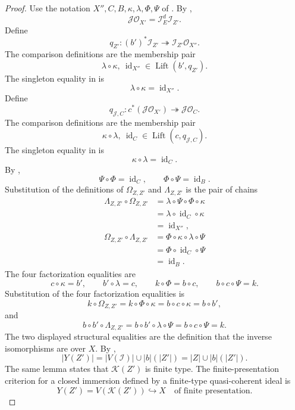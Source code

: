 \begin{proof}
  Use the notation $X'',C,B,\kappa,\lambda,\Phi,\Psi$ of
  .  By
  ,
  \[
    \mathcal J\mathcal O_{X'}
      =\mathcal I_E^d\mathcal I_{Z'}.
  \]
  Define
  \[
    q_{Z'}\colon (b')^*\mathcal I_{Z'}
      \twoheadrightarrow\mathcal I_{Z'}\mathcal O_{X''}.
  \]
  The comparison definitions are the membership pair
  \[
    \lambda\circ\kappa,\ \operatorname{id}_{X''}
      \in\operatorname{Lift}(b',q_{Z'}).
  \]
  The singleton equality in
   is
  \[
    \lambda\circ\kappa=\operatorname{id}_{X''}.
  \]
  Define
  \[
    q_{\mathcal J,C}\colon c^*(\mathcal J\mathcal O_{X'})
      \twoheadrightarrow\mathcal J\mathcal O_C.
  \]
  The comparison definitions are the membership pair
  \[
    \kappa\circ\lambda,\ \operatorname{id}_C
      \in\operatorname{Lift}(c,q_{\mathcal J,C}).
  \]
  The singleton equality in
   is
  \[
    \kappa\circ\lambda=\operatorname{id}_C.
  \]
  By ,
  \[
    \Psi\circ\Phi=\operatorname{id}_C,\qquad
    \Phi\circ\Psi=\operatorname{id}_B.
  \]
  Substitution of the definitions of $\Omega_{Z,Z'}$ and
  $\Lambda_{Z,Z'}$ is the pair of chains
  \[
  \begin{aligned}
    \Lambda_{Z,Z'}\circ\Omega_{Z,Z'}
      &=\lambda\circ\Psi\circ\Phi\circ\kappa\\
      &=\lambda\circ\operatorname{id}_C\circ\kappa\\
      &=\operatorname{id}_{X''},
  \end{aligned}
  \]
  \[
  \begin{aligned}
    \Omega_{Z,Z'}\circ\Lambda_{Z,Z'}
      &=\Phi\circ\kappa\circ\lambda\circ\Psi\\
      &=\Phi\circ\operatorname{id}_C\circ\Psi\\
      &=\operatorname{id}_B.
  \end{aligned}
  \]
  The four factorization equalities are
  \[
    c\circ\kappa=b',\qquad b'\circ\lambda=c,\qquad
    k\circ\Phi=b\circ c,\qquad b\circ c\circ\Psi=k.
  \]
  Substitution of the four factorization equalities is
  \[
    k\circ\Omega_{Z,Z'}
      =k\circ\Phi\circ\kappa
      =b\circ c\circ\kappa
      =b\circ b',
  \]
  and
  \[
    b\circ b'\circ\Lambda_{Z,Z'}
      =b\circ b'\circ\lambda\circ\Psi
      =b\circ c\circ\Psi=k.
  \]
  The two displayed structural equalities are the definition that the
  inverse isomorphisms are over $X$.  By
  ,
  \[
    |Y(Z')|=|V(\mathcal I)|\cup |b|(|Z'|)=|Z|\cup |b|(|Z'|).
  \]
  The same lemma states that $\mathcal K(Z')$ is finite type.  The
  finite-presentation criterion for a closed immersion defined by a
  finite-type quasi-coherent ideal is
  \[
    Y(Z')=V(\mathcal K(Z'))\hookrightarrow X
      \quad\text{of finite presentation}.
  \]
\end{proof}



